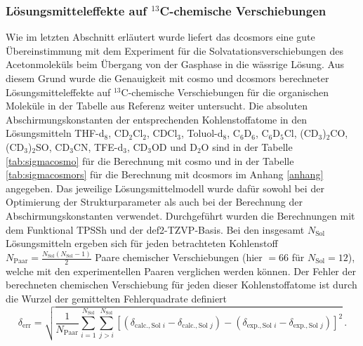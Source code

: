 	\subsubsection{Lösungsmitteleffekte auf \texorpdfstring{$^{13}$C}{13C}-chemische Verschiebungen}
	Wie im letzten Abschnitt erläutert wurde liefert das \ac{dcosmors} eine gute Übereinstimmung mit dem Experiment für die Solvatationsverschiebungen des Acetonmoleküls beim Übergang von der Gasphase in die wässrige Lösung. Aus diesem Grund wurde die Genauigkeit mit \ac{cosmo} und \ac{dcosmors} berechneter Lösungsmitteleffekte auf $^{13}$C-chemische Verschiebungen für die organischen Moleküle in der Tabelle aus Referenz \cite{fulmer2010nmr} weiter untersucht. Die absoluten Abschirmungskonstanten der entsprechenden Kohlenstoffatome in den Lösungsmitteln THF-d$_{8}$, CD$_{2}$Cl$_{2}$, CDCl$_{3}$, Toluol-d$_{8}$, C$_{6}$D$_{6}$, C$_{6}$D$_{5}$Cl, (CD$_{3}$)$_{2}$CO, (CD$_{3}$)$_{2}$SO, CD$_{3}$CN, TFE-d$_{3}$, CD$_{3}$OD und D$_{2}$O sind in der Tabelle \ref{tab:sigmacosmo} für die Berechnung mit \ac{cosmo} und in der Tabelle \ref{tab:sigmacosmors} für die Berechnung mit \ac{dcosmors} im Anhang \ref{anhang} angegeben. Das jeweilige Lösungsmittelmodell wurde dafür sowohl bei der Optimierung der Strukturparameter als auch bei der Berechnung der Abschirmungskonstanten verwendet. Durchgeführt wurden die Berechnungen mit dem Funktional TPSSh\supercite{staroverov2003comparative} und der def2-TZVP-Basis\supercite{weigend2005balanced}. Bei den insgesamt $N_{\textrm{Sol}}$ Lösungsmitteln ergeben sich für jeden betrachteten Kohlenstoff $N_{\textrm{Paar}}=\frac{N_{\textrm{Sol}}(N_{\textrm{Sol}}-1)}{2}$ Paare chemischer Verschiebungen (hier $=66$ für $N_{\textrm{Sol}}=12$), welche mit den experimentellen Paaren verglichen werden können. Der Fehler der berechneten chemischen Verschiebung für jeden dieser Kohlenstoffatome ist durch die Wurzel der gemittelten Fehlerquadrate definiert
	\begin{equation}
	\delta_{\textrm{err}}=\sqrt{\frac{1}{N_{\textrm{Paar}}}\sum_{i=1}^{N_{\textrm{Sol}}}\sum_{j>i}^{N_{\textrm{Sol}}}\left[\left(\delta_{\textrm{calc.},{\textrm{Sol }i}}-\delta_{\textrm{calc.},{\textrm{Sol }j}}\right)-\left(\delta_{\textrm{exp.},{\textrm{Sol }i}}-\delta_{\textrm{exp.},{\textrm{Sol }j}}\right)\right]^2}\, .
	\end{equation}

